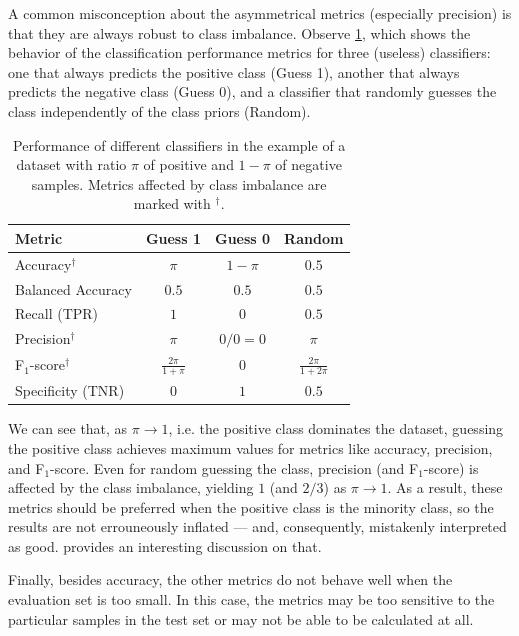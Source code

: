 A common misconception about the asymmetrical metrics (especially precision) is that they
are always robust to class imbalance.  Observe \cref{tab:classification-metrics-ex}, which shows
the behavior of the classification performance metrics for three (useless) classifiers: one
that always predicts the positive class (Guess 1), another that always predicts the
negative class (Guess 0), and a classifier that randomly guesses the class independently
of the class priors (Random).

\begin{table}
  \caption{
    Performance of different classifiers in the example of a dataset with ratio $\pi$ of
    positive and $1-\pi$ of negative samples.  Metrics affected by class imbalance are
    marked with $^\dagger$.
  }
  \label{tab:classification-metrics-ex}
  \centering
  \begin{tabular}{l c c c}
    \toprule
    \textbf{Metric} & \textbf{Guess 1} & \textbf{Guess 0} & \textbf{Random} \\
    \midrule
    Accuracy$^\dagger$ & $\pi$ & $1 - \pi$ & $0.5$ \\
    Balanced Accuracy & $0.5$ & $0.5$ & $0.5$ \\
    Recall (TPR) & $1$ & $0$ & $0.5$ \\
    Precision$^\dagger$ & $\pi$ & $0/0 = 0$ & $\pi$ \\
    F$_1$-score$^\dagger$ & $\frac{2 \pi}{1 + \pi}$ & 0 & $\frac{2 \pi}{1 + 2\pi}$ \\
    Specificity (TNR) & $0$ & $1$ & $0.5$ \\
    \bottomrule
  \end{tabular}
\end{table}

We can see that, as $\pi \to 1$, i.e. the positive class dominates the dataset, guessing
the positive class achieves maximum values for metrics like accuracy, precision, and
F$_1$-score.  Even for random guessing the class, precision (and F$_1$-score) is affected
by the class imbalance, yielding $1$ (and $2/3$) as $\pi \to 1$.  As a result, these
metrics should be preferred when the positive class is the minority class, so the results
are not errouneously inflated --- and, consequently, mistakenly interpreted as good.
\textcite{Williams2021} provides an interesting discussion on
that.

Finally, besides accuracy, the other metrics do not behave well when the evaluation set is
too small.  In this case, the metrics may be too sensitive to the particular samples in
the test set or may not be able to be calculated at all.

